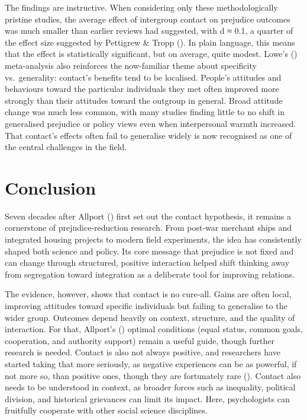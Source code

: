 \documentclass[
  letterpaper,
]{book}
\begin{document}
The findings are instructive. When considering only these
methodologically pristine studies, the average effect of intergroup
contact on prejudice outcomes was much smaller than earlier reviews had
suggested, with d ≈ 0.1, a quarter of the effect size suggested by
Pettigrew \& Tropp (). In plain
language, this means that the effect is statistically significant, but
on average, quite modest. Lowe's ()
meta-analysis also reinforces the now-familiar theme about specificity
vs.~generality: contact's benefits tend to be localised. People's
attitudes and behaviours toward the particular individuals they met
often improved more strongly than their attitudes toward the outgroup in
general. Broad attitude change was much less common, with many studies
finding little to no shift in generalised prejudice or policy views even
when interpersonal warmth increased. That contact's effects often fail
to generalise widely is now recognised as one of the central challenges
in the field.

\section{Conclusion}\label{conclusion-18}

Seven decades after Allport () first
set out the contact hypothesis, it remains a cornerstone of
prejudice‐reduction research. From post‐war merchant ships and
integrated housing projects to modern field experiments, the idea has
consistently shaped both science and policy. Its core message that
prejudice is not fixed and can change through structured, positive
interaction helped shift thinking away from segregation toward
integration as a deliberate tool for improving relations.

The evidence, however, shows that contact is no cure‐all. Gains are
often local, improving attitudes toward specific individuals but failing
to generalise to the wider group. Outcomes depend heavily on context,
structure, and the quality of interaction. For that, Allport's
() optimal conditions (equal status,
common goals, cooperation, and authority support) remain a useful guide,
though further research is needed. Contact is also not always positive,
and researchers have started taking that more seriously, as negative
experiences can be as powerful, if not more so, than positive ones,
though they are fortunately rare
(). Contact
also needs to be understood in context, as broader forces such as
inequality, political division, and historical grievances can limit its
impact. Here, psychologists can fruitfully cooperate with other social
science disciplines.
\end{document}
